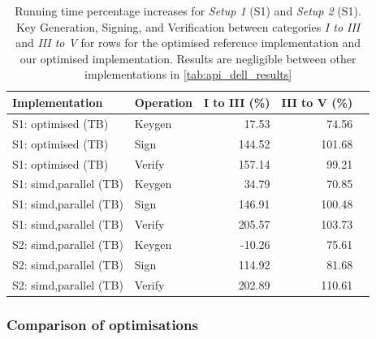 \documentclass[11pt]{report}
\theoremstyle{definition}
\theoremstyle{plain}
\begin{document}
\begin{table}[!ht]
  \centering
  \begin{tabular}{l|l|rrr}
    \hline
    Implementation                              & Operation & I to III (\%) & III to V (\%) \\
    \hline
    S1: optimised (TB)~\cite{aguilarsyndrome11} & Keygen    & 17.53         & 74.56         \\
    S1: optimised (TB)~\cite{aguilarsyndrome11} & Sign      & 144.52        & 101.68        \\
    S1: optimised (TB)~\cite{aguilarsyndrome11} & Verify    & 157.14        & 99.21         \\
    \hline
    S1: simd,parallel (TB)                      & Keygen    & 34.79         & 70.85         \\
    S1: simd,parallel (TB)                      & Sign      & 146.91        & 100.48        \\
    S1: simd,parallel (TB)                      & Verify    & 205.57        & 103.73        \\
    \hline
    S2: simd,parallel (TB)                      & Keygen    & -10.26        & 75.61         \\
    S2: simd,parallel (TB)                      & Sign      & 114.92        & 81.68         \\
    S2: simd,parallel (TB)                      & Verify    & 202.89        & 110.61        \\
    \hline
  \end{tabular}
  \caption{Running time percentage increases for \textit{Setup 1} (S1) and \textit{Setup 2} (S1). Key Generation, Signing, and Verification between categories \textit{I to III} and \textit{III to V} for rows for the optimised reference implementation \cite{aguilarsyndrome11} and our optimised implementation. Results are negligible between other implementations in \autoref{tab:api_dell_results}}
  \label{tab:api_percentage_increase}
\end{table}

\subsubsection{Comparison of optimisations}\label{sub:comparison_optimisations}
\end{document}
